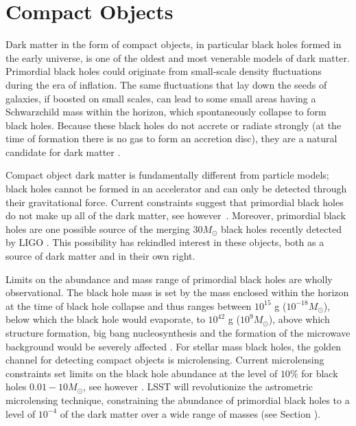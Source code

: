 \section{Compact Objects }
\label{sec:machos}


Dark matter in the form of compact objects, in particular black holes formed in the early universe, is one of the oldest and most venerable models of dark matter. Primordial black holes could originate from small-scale density fluctuations during the era of inflation. The same fluctuations that lay down the seeds of galaxies, if boosted on small scales, can lead to some small areas having a Schwarzchild mass within the horizon, which spontaneously collapse to form black holes. Because these black holes do not accrete or radiate strongly (at the time of formation there is no gas to form an accretion disc), they are a natural candidate for dark matter \citep{Carr:1974nx,Carr:2016drx}. 

Compact object dark matter is fundamentally different from particle models; black holes cannot be formed in an accelerator and can only be detected through their gravitational force. Current constraints suggest that primordial black holes do not make up all of the dark matter, see however~\citep{Clesse:2017}. Moreover, primordial black holes are one possible source of the merging $30 M_\odot$ black holes recently detected by LIGO \citep{Bird:2016,Clesse:2016}. This possibility has rekindled interest in these objects, both as a source of dark matter and in their own right.

Limits on the abundance and mass range of primordial black holes are wholly observational. The black hole mass is set by the mass enclosed within the horizon at the time of black hole collapse and thus ranges between $10^{15}$ g ($10^{-18} M_\odot$), below which the black hole would evaporate, to $10^{42}$ g  ($10^9 M_\odot$), above which structure formation, big bang nucleosynthesis and the formation of the microwave background would be severely affected \citep{Sasaki:2018}. 
For stellar mass black holes, the golden channel for detecting compact objects is microlensing. Current microlensing constraints set limits on the black hole abundance at the level of $10\%$ for black holes $0.01 - 10 M_\odot$, see however \citep{2018MNRAS.479.2889C}. LSST will revolutionize the astrometric microlensing technique,  constraining the abundance of primordial black holes to a level of $10^{-4}$ of the dark matter over a wide range of masses (see Section ).

